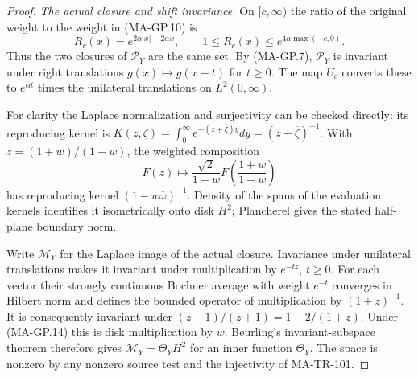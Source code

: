 \begin{proof}
\emph{The actual closure and shift invariance.}
On $[c,\infty)$ the ratio of the original weight to the weight
in (MA-GP.10) is
\[
 R_c(x)=e^{2\alpha|x|-2\alpha x},\qquad
            1\le R_c(x)\le e^{4\alpha\max(-c,0)}.
 \tag{MA-GP.13}
\]
Thus the two closures of $\mathscr P_Y$ are the same set.
By (MA-GP.7), $\mathscr P_Y$ is invariant under right
translations $g(x)\mapsto g(x-t)$ for $t\ge0$.
The map $U_c$ converts these to $e^{\alpha t}$ times
the unilateral translations on $L^2(0,\infty)$.

For clarity the Laplace normalization and surjectivity can
be checked directly: its reproducing kernel is
$K(z,\zeta)=\int_0^\infty e^{-(z+\overline\zeta)y}dy
=(z+\overline\zeta)^{-1}$.
With $z=(1+w)/(1-w)$, the weighted composition
\[
 F(z)\longmapsto \frac{\sqrt2}{1-w}
                         F\!\left(\frac{1+w}{1-w}\right)
 \tag{MA-GP.14}
\]
has reproducing kernel $(1-w\overline\omega)^{-1}$.
Density of the spans of the evaluation kernels identifies
it isometrically onto disk $H^2$; Plancherel gives the
stated half-plane boundary norm.

Write $\mathcal M_Y$ for the Laplace image of the actual
closure.  Invariance under unilateral translations makes
it invariant under multiplication by $e^{-tz}$, $t\ge0$.
For each vector their strongly continuous Bochner average with
weight $e^{-t}$ converges in Hilbert norm and defines the bounded
operator of multiplication by $(1+z)^{-1}$.
It is consequently invariant under
$(z-1)/(z+1)=1-2/(1+z)$.
Under (MA-GP.14) this is disk multiplication by $w$.
Beurling's invariant-subspace theorem therefore gives
$\mathcal M_Y=\Theta_Y H^2$ for an inner function $\Theta_Y$.
The space is nonzero by any nonzero source test and the
injectivity of MA-TR-101.


\end{proof}
